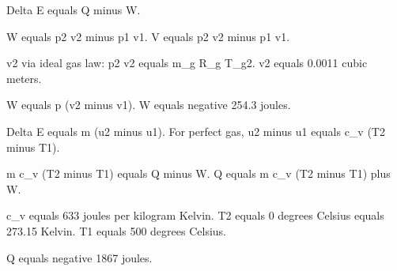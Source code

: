Delta E equals Q minus W.  

W equals p2 v2 minus p1 v1.  
V equals p2 v2 minus p1 v1.  

v2 via ideal gas law:  
p2 v2 equals m_g R_g T_g2.  
v2 equals 0.0011 cubic meters.  

W equals p (v2 minus v1).  
W equals negative 254.3 joules.  

Delta E equals m (u2 minus u1).  
For perfect gas, u2 minus u1 equals c_v (T2 minus T1).  

m c_v (T2 minus T1) equals Q minus W.  
Q equals m c_v (T2 minus T1) plus W.  

c_v equals 633 joules per kilogram Kelvin.  
T2 equals 0 degrees Celsius equals 273.15 Kelvin.  
T1 equals 500 degrees Celsius.  

Q equals negative 1867 joules.